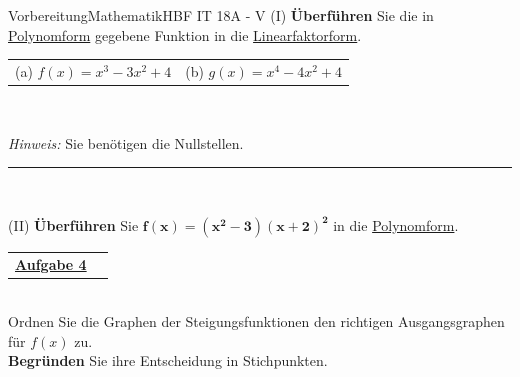 \documentclass[oneside,openany,headings=optiontotoc,11pt,numbers=noenddot]{scrreprt}
\begin{document}
\begin{test}{Vorbereitung}{Mathematik}{HBF IT 18A - V}
		(I) \textbf{Überführen} Sie die in \underline{Polynomform} gegebene Funktion in die \underline{Linearfaktorform}.\\
		\par\noindent
		\begin{tabularx}{\textwidth}{MM}
			(a) \(f(x) = x^3 - 3x^2 +4\) & (b) \(g(x) = x^4 -4x^2 + 4\)
		\end{tabularx}\\
		\par\noindent
		\footnotesize{\textit{Hinweis:} Sie benötigen die Nullstellen.}\\
		\rule{\textwidth}{0.1pt}\\
		\par\noindent
		\normalsize
		(II) \textbf{Überführen} Sie \(\mathbf{f(x) = (x^2 - 3)(x+2)^2}\) in die \underline{Polynomform}.
		\par\noindent
	\end{test}
	\noindent
	\begin{tabularx}{\textwidth}{Xl}\underline{\textbf{Aufgabe 4}}&\end{tabularx}\\
	Ordnen Sie die Graphen der Steigungsfunktionen den richtigen Ausgangsgraphen für \(f(x)\) zu.\\
	\textbf{Begründen} Sie ihre Entscheidung in Stichpunkten.\\
\end{document}
